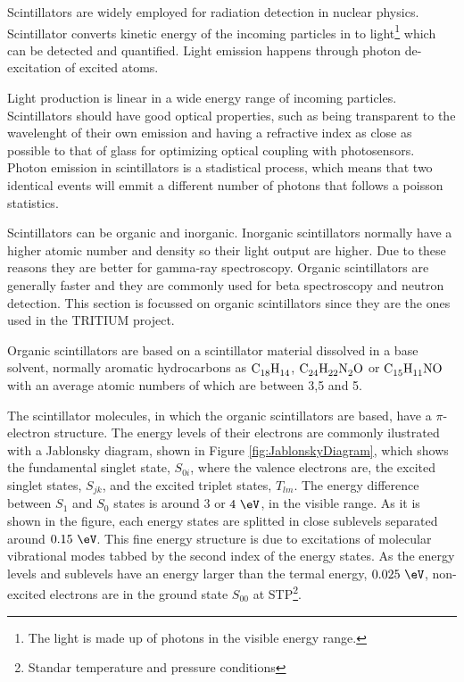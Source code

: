 Scintillators are widely employed for radiation detection in nuclear physics. Scintillator converts kinetic energy of the incoming particles in to light\footnote{The light is made up of photons in the visible energy range.} which can be detected and quantified. Light emission happens through photon de-excitation of excited atoms.

Light production is linear in a wide energy range of incoming particles. Scintillators should have good optical properties, such as being transparent to the wavelenght of their own emission and having a refractive index as close as possible to that of glass for optimizing optical coupling with photosensors. Photon emission in scintillators is a stadistical process, which means that two identical events will emmit a different number of photons that follows a poisson statistics.

Scintillators can be organic and inorganic. Inorganic scintillators normally have a higher atomic number and density so their light output are higher. Due to these reasons they are better for gamma-ray spectroscopy. Organic scintillators are generally faster and they are commonly used for beta spectroscopy and neutron detection. This section is focussed on organic scintillators since they are the ones used in the TRITIUM project. 

Organic scintillators are based on a scintillator material dissolved in a base solvent, normally aromatic hydrocarbons as $\ce{C_{18}H_{14}}$, $\ce{C_{24}H_{22}N_{2}O}$ or $\ce{C_{15}H_{11}NO}$ with an average atomic numbers of which are between 3,5 and 5.

The scintillator molecules, in which the organic scintillators are based, have a $\pi$-electron structure. The energy levels of their electrons are commonly ilustrated with a Jablonsky diagram, shown in Figure \ref{fig:JablonskyDiagram}, which shows the fundamental singlet state, $S_{0i}$, where the valence electrons are, the excited singlet states, $S_{jk}$, and the excited triplet states, $T_{lm}$. The energy difference between $S_1$ and $S_0$ states is around $3$ or $4~\eV$, in the visible range. As it is shown in the figure, each energy states are splitted in close sublevels separated around $0.15~\eV$. This fine energy structure is due to excitations of molecular vibrational modes tabbed by the second index of the energy states. As the energy levels and sublevels have an energy larger than the termal energy, $0.025~\eV$, non-excited electrons are in the ground state $S_{00}$ at STP\footnote{Standar temperature and pressure conditions}.

